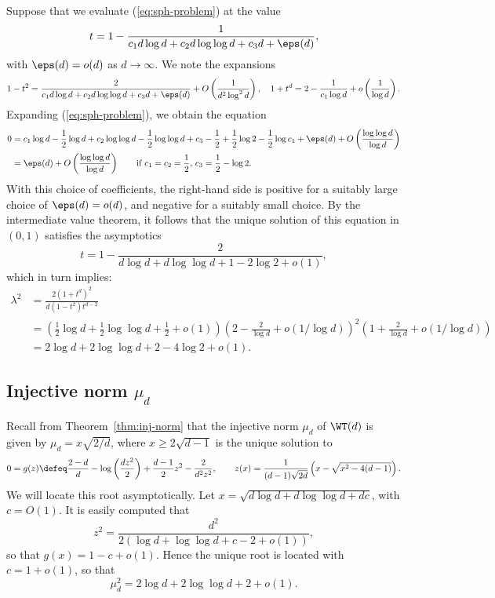 \documentclass{article}
\begin{document}
\noindent Suppose that we evaluate (\ref{eq:sph-problem}) at the value
$$ t = 1 - \frac{1}{c_1 d \log d  + c_2 d \log \log d + c_3 d + \eps(d)}, $$
with $\eps(d) = o(d)$ as $d \to \infty$. We note the expansions
$$ 1-t^2 = \frac{2}{c_1 d \log d + c_2 d \log \log d + c_3 d + \eps(d)} + O\left(\frac{1}{d^2 \log^2 d}\right), \quad 1+t^d = 2 - \frac{1}{c_1 \log d} + o\left(\frac{1}{\log d}\right). $$
Expanding (\ref{eq:sph-problem}), we obtain the equation
\begin{align*}
0 &= c_1 \log d - \frac12 \log d + c_2 \log \log d - \frac12 \log \log d + c_3 - \frac12 + \frac12 \log 2 - \frac12 \log c_1 + \eps(d) + O\left(\frac{\log \log d}{\log d}\right) \\
&= \eps(d) + O\left(\frac{\log \log d}{\log d}\right) \qquad \text{if $c_1 = c_2 = \frac12$, $c_3 = \frac12 - \log 2$.}
\end{align*}
With this choice of coefficients, the right-hand side is positive for a suitably large choice of $\eps(d) = o(d)$, and negative for a suitably small choice. By the intermediate value theorem, it follows that the unique solution of this equation in $(0,1)$ satisfies the asymptotics
$$ t = 1 - \frac{2}{d \log d + d \log \log d + 1 - 2 \log 2 + o(1)}, $$
which in turn implies:
\begin{align*}
    \lambda^2 &= \frac{2(1+t^d)^2}{d(1-t^2)t^{d-2}} \\
    &= \left( \frac12 \log d + \frac12 \log \log d + \frac12 + o(1) \right)\left(2 - \frac{2}{\log d} + o(1/\log d)\right)^2\left(1+\frac{2}{\log d}+o(1/\log d)\right) \\
    &= 2 \log d + 2 \log \log d + 2 - 4 \log 2 + o(1).
\end{align*}



\subsection{Injective norm $\mu_d$}

Recall from Theorem~\ref{thm:inj-norm} that the injective norm $\mu_d$ of $\WT(d)$ is given by $\mu_d = x\sqrt{2/d}$, where $x \geq 2\sqrt{d-1}$ is the unique solution to
$$ 0 = g(z) \defeq \frac{2-d}{d} - \log\left(\frac{dz^2}{2}\right) + \frac{d-1}{2} z^2 - \frac{2}{d^2 z^2}, \qquad z(x) = \frac{1}{(d-1)\sqrt{2d}} \left(x - \sqrt{x^2 - 4(d-1)}\right). $$
We will locate this root asymptotically. Let $x = \sqrt{d \log d + d \log \log d + d c}$, with $c = O(1)$. It is easily computed that
$$ z^2 = \frac{d^2}{2 (\log d + \log \log d + c - 2 + o(1))}, $$
so that $g(x) = 1 - c + o(1)$. Hence the unique root is located with $c = 1 + o(1)$, so that
$$ \mu_d^2 = 2 \log d + 2 \log \log d + 2 + o(1). $$
\end{document}
